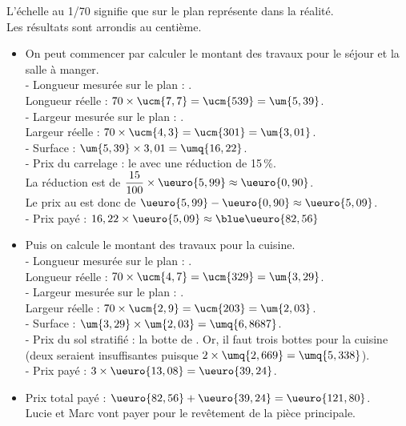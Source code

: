 \begin{colonne*exercice}
\begin{corrige}
   L'échelle au 1/70 signifie que  sur le plan représente  dans la réalité. \\
   Les résultats sont arrondis au centième. \\
   \begin{itemize}  
      \item On peut commencer par calculer le montant des travaux pour le séjour et la salle à manger. \\
         - Longueur mesurée sur le plan : . \\ 
           Longueur réelle : $70\times\ucm{7,7} =\ucm{539} =\um{5,39}$. \\
         - Largeur mesurée sur le plan : . \\
           Largeur réelle : $70\times\ucm{4,3} =\ucm{301} =\um{3,01}$. \\
         - Surface : $\um{5,39}\times3,01 =\umq{16,22}$. \\
         - Prix du carrelage :  le \umq{} avec une réduction de 15\,\%. \\
      La réduction est de $\dfrac{15}{100}\times\ueuro{5,99} \approx\ueuro{0,90}$. \\
      Le prix au \umq{} est donc de $\ueuro{5,99}-\ueuro{0,90} \approx\ueuro{5,09}$. \\
         - Prix payé : $16,22\times\ueuro{5,09} \approx{\blue \ueuro{82,56}}$ \\
      \item Puis on calcule le montant des travaux pour la cuisine. \\
         - Longueur mesurée sur le plan : . \\
           Longueur réelle : $70\times\ucm{4,7} =\ucm{329} =\um{3,29}$. \\
         - Largeur mesurée sur le plan : . \\
           Largeur réelle : $70\times\ucm{2,9} =\ucm{203} =\um{2,03}$. \\
         - Surface : $\um{3,29}\times\um{2,03} =\umq{6,8687}$. \\
         - Prix du sol stratifié :  la botte de . Or, il faut trois bottes pour la cuisine (deux seraient insuffisantes puisque $2\times\umq{2,669} =\umq{5,338}$). \\
         - Prix payé : $3\times\ueuro{13,08} =\ueuro{39,24}$. \\
      \item Prix total payé : $\ueuro{82,56}+\ueuro{39,24} =\ueuro{121,80}$. \\
      {\blue Lucie et Marc vont payer  pour le revêtement de la pièce principale.}
\end{itemize}

\end{corrige}
\end{colonne*exercice}

